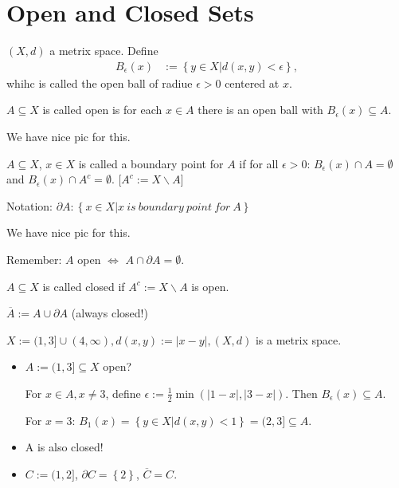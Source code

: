 \documentclass[../../note.tex]{subfiles}
\begin{document}
\section{Open and Closed Sets}
\begin{definition}
    $(X,d)$ a metrix space. Define 
    \begin{align}
        B_{\epsilon}(x)
        &:= \left\{y \in X \vert d(x,y) < \epsilon \right\},
    \end{align}
    whihc is called the open ball of radiue $\epsilon > 0$ centered at $x$.
\end{definition}

\begin{definition}
    $A \subseteq X$ is called open is for each $x \in A$ there is an open ball with $B_{\epsilon}(x) \subseteq A$.
\end{definition}
We have nice pic for this.

\begin{definition}
    $A \subseteq X$, $x \in X$ is called a boundary point for $A$ if for all $\epsilon > 0$: $B_{\epsilon}(x) \cap A = \emptyset$ and  $B_{\epsilon}(x) \cap A^c = \emptyset$. [$A^c:= X \backslash A$]

    Notation: $\partial A: \left\{x \in X \vert x~is~boundary~point~for~A \right\}$
\end{definition}
We have nice pic for this.

Remember: $A$ open $\Longleftrightarrow$ $A \cap \partial A = \emptyset$.

\begin{definition}
    $A \subseteq X$ is called closed if $A^c:= X \backslash A$ is open.
\end{definition}

\begin{definition}[Closure]
    $\overline{A}:= A \cup \partial A$ (always closed!)
\end{definition}

\begin{example}
    $X:= (1,3] \cup (4, \infty), d(x,y):= \vert x - y \vert, (X,d)$ is a metrix space.
    \begin{itemize}
        \item $A:= (1,3] \subseteq X$ open? 
        
        For $x \in A, x \neq 3$, define $\epsilon:= \frac{1}{2}\min\left(\vert 1-x \vert, \vert 3 - x \vert \right)$. Then $B_{\epsilon}(x) \subseteq A$.

        For $x = 3$: $B_1(x) = \left\{y \in X \vert d(x,y) <1 \right\} = (2,3] \subseteq A$.
        \item A is also closed!
        \item $C:= (1,2]$, $\partial C = \left\{2\right\}$, $\overline{C} = C$.
    \end{itemize}
\end{example}
\end{document}
